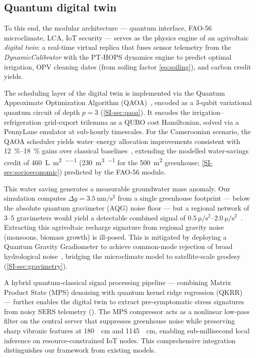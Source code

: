 \documentclass[12pt]{iopart}
\begin{document}
\subsection{Quantum digital twin}

To this end, the modular architecture --- quantum interface, FAO-56 microclimate, LCA, IoT security --- serves as the physics engine of an agrivoltaic \emph{digital twin}: a real-time virtual replica that fuses sensor telemetry from the \textit{DynamicCalibrator} with the PT-HOPS dynamics engine to predict optimal irrigation, OPV cleaning dates (from soiling factor \cref{eq:soiling}), and carbon credit yields.

The scheduling layer of the digital twin is implemented via the Quantum Approximate Optimization Algorithm (QAOA)~\cite{Farhi2014,AlSagri2025}, encoded as a 3-qubit variational quantum circuit of depth $p=3$ (\cref{SI-sec:qaoa}). It encodes the irrigation--refrigeration--grid-export trilemma as a QUBO cost Hamiltonian, solved via a PennyLane emulator at sub-hourly timescales. For the Cameroonian scenario, the QAOA scheduler yields water--energy allocation improvements consistent with \qtyrange{12}{18}{\percent} gains over classical baselines~\cite{AlSagri2025}, extending the modelled water-savings credit of \qty{460}{\L\per\m\squared\per\yr} (\qty{230}{\m\cubed\per\yr} for the \qty{500}{\m\squared} greenhouse; \cref{SI-sec:socioeconomic}) predicted by the FAO-56 module.

This water saving generates a measurable groundwater mass anomaly. Our simulation computes $\Delta g = \qty{3.5}{\nm\per\s\squared}$ from a single greenhouse footprint --- below the absolute quantum gravimeter (AQG) noise floor --- but a regional network of 3--5 gravimeters would yield a detectable combined signal of $\qtyrange{0.5}{2.0}{\micro\per\s\squared}$~\cite{Stray2022,Menoret2018}. Extracting this agrivoltaic recharge signature from regional gravity noise (monsoons, biomass growth) is ill-posed. This is mitigated by deploying a Quantum Gravity Gradiometer to achieve common-mode rejection of broad hydrological noise~\cite{Stray2022}, bridging the microclimate model to satellite-scale geodesy (\cref{SI-sec:gravimetry}).

A hybrid quantum-classical signal processing pipeline --- combining Matrix Product State (MPS) denoising with quantum kernel ridge regression (QKRR)~\cite{Stoudenmire2016,Havlicek2019} --- further enables the digital twin to extract pre-symptomatic stress signatures from noisy SERS telemetry (). The MPS compressor acts as a nonlinear low-pass filter on the central server that suppresses greenhouse noise while preserving sharp vibronic features at \qty{180}{\per\cm} and \qty{1145}{\per\cm}, enabling sub-millisecond local inference on resource-constrained IoT nodes. This comprehensive integration distinguishes our framework from existing models.
\end{document}
